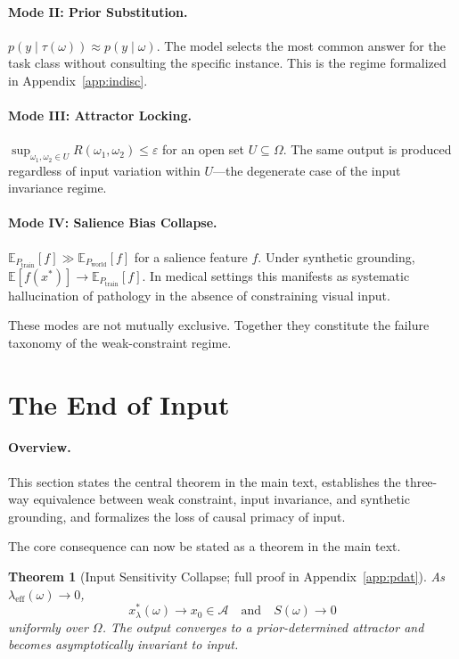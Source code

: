 \documentclass[twocolumn,10pt]{article}
\theoremstyle{thmstyle}
\newtheorem{theorem}{Theorem}[section]
\theoremstyle{defstyle}
\newcommand{\leff}{\lambda_{\mathrm{eff}}}
\newcommand{\Aset}{\mathcal{A}}
\newcommand{\Rop}{R}
\begin{document}
\paragraph{Mode II: Prior Substitution.}
$p(y\mid\tau(\omega))\approx p(y\mid\omega)$. The model selects the
most common answer for the task class without consulting the specific
instance. This is the regime formalized in Appendix~\ref{app:indisc}.

\paragraph{Mode III: Attractor Locking.}
$\sup_{\omega_1,\omega_2\in U}\Rop(\omega_1,\omega_2)\leq\varepsilon$
for an open set $U\subseteq\Omega$. The same output is produced
regardless of input variation within $U$---the degenerate case of the
input invariance regime.

\paragraph{Mode IV: Salience Bias Collapse.}
$\mathbb{E}_{P_{\mathrm{train}}}[f]\gg\mathbb{E}_{P_{\mathrm{world}}}[f]$
for a salience feature $f$. Under synthetic grounding,
$\mathbb{E}[f(x^*)]\to\mathbb{E}_{P_{\mathrm{train}}}[f]$. In medical
settings this manifests as systematic hallucination of pathology in the
absence of constraining visual input.

These modes are not mutually exclusive. Together they constitute the
failure taxonomy of the weak-constraint regime.

\section{The End of Input}
\label{sec:endinput}

\paragraph{Overview.}
This section states the central theorem in the main text, establishes
the three-way equivalence between weak constraint, input invariance, and
synthetic grounding, and formalizes the loss of causal primacy of input.

The core consequence can now be stated as a theorem in the main text.

\begin{theorem}[Input Sensitivity Collapse; full proof in
Appendix~\ref{app:pdat}]
\label{thm:isc2}
As $\leff(\omega)\to 0$,
\[
  x^*_\lambda(\omega)\to x_0\in\Aset
  \quad\text{and}\quad S(\omega)\to 0
\]
uniformly over $\Omega$. The output converges to a prior-determined
attractor and becomes asymptotically invariant to input.
\end{theorem}
\end{document}
